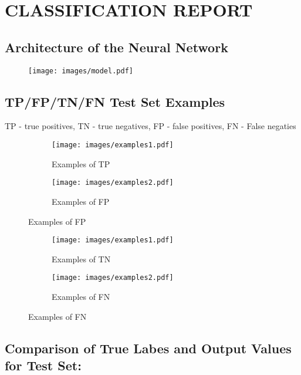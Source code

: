 \documentclass{article}%
\begin{document}
%
\normalsize%
\section*{CLASSIFICATION REPORT}%
\label{sec:CLASSIFICATIONREPORT}%
\subsection*{Architecture of the Neural Network}%
\label{subsec:ArchitectureoftheNeuralNetwork}%


\begin{figure}[h!]%
\centering%
\texttt{[image: images/model.pdf]}%
\end{figure}

%
\subsection*{TP/FP/TN/FN Test Set Examples}%
\label{subsec:TP/FP/TN/FNTestSetExamples}%
TP {-} true positives, TN {-} true negatives, FP {-} false positives, FN {-} False negaties%


\begin{figure}[h!]%
\centering%
\begin{subfigure}[c]{0.33\linewidth}%
\texttt{[image: images/examples1.pdf]}%
\caption{Examples of TP}%
\end{subfigure}%
\begin{subfigure}[c]{0.33\linewidth}%
\texttt{[image: images/examples2.pdf]}%
\caption{Examples of FP}%
\end{subfigure}%
\end{figure}

%


\begin{figure}[h!]%
\centering%
\begin{subfigure}[c]{0.33\linewidth}%
\texttt{[image: images/examples1.pdf]}%
\caption{Examples of TN}%
\end{subfigure}%
\begin{subfigure}[c]{0.33\linewidth}%
\texttt{[image: images/examples2.pdf]}%
\caption{Examples of FN}%
\end{subfigure}%
\end{figure}

%
\subsection*{Comparison of True Labes and Output Values for Test Set:}%
\label{subsec:ComparisonofTrueLabesandOutputValuesforTestSet}%
\end{document}
